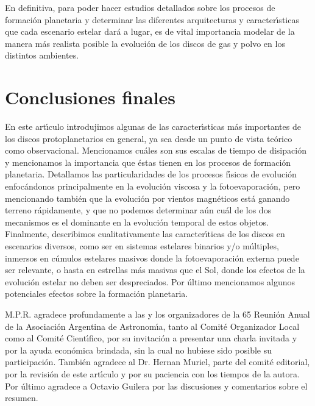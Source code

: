 \documentclass[baaa]{baaa}
\begin{document}
En definitiva, para poder hacer estudios detallados sobre los procesos de formaci\'on planetaria y determinar las diferentes arquitecturas y caracter\'{\i}sticas que cada escenario estelar dar\'a a lugar, es de vital importancia modelar de la manera m\'as realista posible la evoluci\'on de los discos de gas y polvo en los distintos ambientes.


\section{Conclusiones finales}

En este art\'{\i}culo introdujimos algunas de las caracter\'{\i}sticas m\'as importantes de los discos protoplanetarios en general, ya sea desde un punto de vista te\'orico como observacional. Mencionamos cu\'ales son sus escalas de tiempo de disipaci\'on y mencionamos la importancia que \'estas tienen en los procesos de formaci\'on planetaria.
Detallamos las particularidades de los procesos f\'{\i}sicos de evoluci\'on enfoc\'andonos principalmente en la evoluci\'on viscosa y la fotoevaporaci\'on, pero mencionando tambi\'en que la evoluci\'on por vientos magn\'eticos est\'a ganando terreno r\'apidamente, y que no podemos determinar a\'un cu\'al de los dos mecanismos es el dominante en la evoluci\'on temporal de estos objetos. Finalmente, describimos cualitativamente las caracter\'{\i}ticas de los discos en escenarios diversos, como ser en sistemas estelares binarios y/o m\'ultiples, inmersos en c\'umulos estelares masivos donde la fotoevaporaci\'on externa puede ser relevante, o hasta en estrellas m\'as masivas que el Sol, donde los efectos de la evoluci\'on estelar no deben ser despreciados.
Por \'ultimo mencionamos algunos potenciales efectos sobre la formaci\'on planetaria.



\begin{acknowledgement}
M.P.R. agradece profundamente a las y los organizadores de la 65 Reuni\'on Anual de la Asociaci\'on Argentina de
Astronom\'{\i}a, tanto al Comit\'e Organizador Local como al Comit\'e Cient\'{\i}fico, por su invitaci\'on a presentar una charla invitada y por la ayuda econ\'omica brindada, sin la cual no hubiese sido posible su participaci\'on. Tambi\'en agradece al Dr. Hernan Muriel, parte del comité editorial, por la revisi\'on de este art\'{\i}culo y por su paciencia con los tiempos de la autora. Por \'ultimo agradece a Octavio Guilera por las discusiones y comentarios sobre el resumen. 
\end{acknowledgement}
\end{document}
